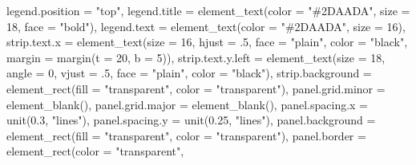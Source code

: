 \documentclass[
]{book}
\newenvironment{Shaded}{\begin{snugshade}}{\end{snugshade}}
\newcommand{\AttributeTok}[1]{\textcolor[rgb]{0.77,0.63,0.00}{#1}}
\newcommand{\DecValTok}[1]{\textcolor[rgb]{0.00,0.00,0.81}{#1}}
\newcommand{\FloatTok}[1]{\textcolor[rgb]{0.00,0.00,0.81}{#1}}
\newcommand{\FunctionTok}[1]{\textcolor[rgb]{0.00,0.00,0.00}{#1}}
\newcommand{\NormalTok}[1]{#1}
\newcommand{\StringTok}[1]{\textcolor[rgb]{0.31,0.60,0.02}{#1}}
\begin{document}
\begin{Shaded}
\begin{Highlighting}[]
    \AttributeTok{legend.position =} \StringTok{"top"}\NormalTok{,}
    \AttributeTok{legend.title =} \FunctionTok{element\_text}\NormalTok{(}\AttributeTok{color =} \StringTok{"\#2DAADA"}\NormalTok{, }
                                \AttributeTok{size =} \DecValTok{18}\NormalTok{, }
                                \AttributeTok{face =} \StringTok{"bold"}\NormalTok{),}
    \AttributeTok{legend.text =} \FunctionTok{element\_text}\NormalTok{(}\AttributeTok{color =} \StringTok{"\#2DAADA"}\NormalTok{, }
                               \AttributeTok{size =} \DecValTok{16}\NormalTok{),}
    \AttributeTok{strip.text.x =} \FunctionTok{element\_text}\NormalTok{(}\AttributeTok{size =} \DecValTok{16}\NormalTok{, }
                                \AttributeTok{hjust =}\NormalTok{ .}\DecValTok{5}\NormalTok{, }
                                \AttributeTok{face =} \StringTok{"plain"}\NormalTok{, }
                                \AttributeTok{color =} \StringTok{"black"}\NormalTok{, }
                                \AttributeTok{margin =} \FunctionTok{margin}\NormalTok{(}\AttributeTok{t =} \DecValTok{20}\NormalTok{, }\AttributeTok{b =} \DecValTok{5}\NormalTok{)),}
    \AttributeTok{strip.text.y.left =} \FunctionTok{element\_text}\NormalTok{(}\AttributeTok{size =} \DecValTok{18}\NormalTok{, }
                                     \AttributeTok{angle =} \DecValTok{0}\NormalTok{, }
                                     \AttributeTok{vjust =}\NormalTok{ .}\DecValTok{5}\NormalTok{, }
                                     \AttributeTok{face =} \StringTok{"plain"}\NormalTok{, }
                                     \AttributeTok{color =} \StringTok{"black"}\NormalTok{),}
    \AttributeTok{strip.background =} \FunctionTok{element\_rect}\NormalTok{(}\AttributeTok{fill =} \StringTok{"transparent"}\NormalTok{, }
                                    \AttributeTok{color =} \StringTok{"transparent"}\NormalTok{),}
    \AttributeTok{panel.grid.minor =} \FunctionTok{element\_blank}\NormalTok{(),}
    \AttributeTok{panel.grid.major =} \FunctionTok{element\_blank}\NormalTok{(),}
    \AttributeTok{panel.spacing.x =} \FunctionTok{unit}\NormalTok{(}\FloatTok{0.3}\NormalTok{, }\StringTok{"lines"}\NormalTok{),}
    \AttributeTok{panel.spacing.y =} \FunctionTok{unit}\NormalTok{(}\FloatTok{0.25}\NormalTok{, }\StringTok{"lines"}\NormalTok{),}
    \AttributeTok{panel.background =} \FunctionTok{element\_rect}\NormalTok{(}\AttributeTok{fill =} \StringTok{"transparent"}\NormalTok{, }
                                    \AttributeTok{color =} \StringTok{"transparent"}\NormalTok{),}
    \AttributeTok{panel.border =} \FunctionTok{element\_rect}\NormalTok{(}\AttributeTok{color =} \StringTok{"transparent"}\NormalTok{, }

\end{Highlighting}
\end{Shaded}
\end{document}
